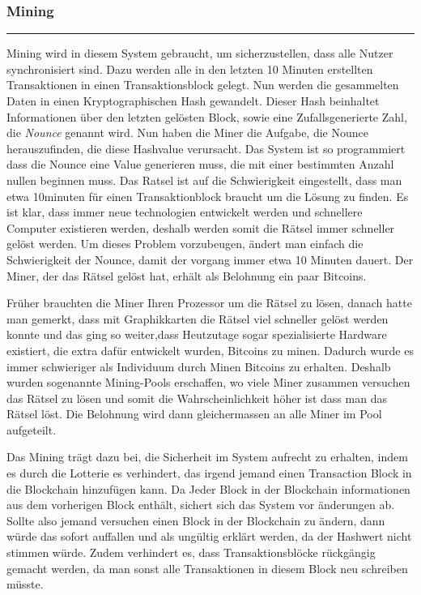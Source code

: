 \vspace*{1mm}
\subsubsection*{Mining}
\vspace{-10mm}
\noindent\rule{0.8\textwidth}{0.4pt}

\vspace{5mm}

\noindent
Mining wird in diesem System gebraucht, um sicherzustellen, dass alle Nutzer synchronisiert sind. Dazu werden alle in den letzten 10 Minuten erstellten Transaktionen in einen Transaktionsblock gelegt.
Nun werden die gesammelten Daten in einen Kryptographischen Hash gewandelt. Dieser Hash beinhaltet Informationen über den letzten gelösten Block, sowie eine Zufallsgenerierte Zahl, die
\emph{\dq Nounce \dq} genannt wird. Nun haben die Miner die Aufgabe, die Nounce herauszufinden, die diese Hashvalue verursacht. Das System ist so programmiert dass die Nounce eine Value
generieren muss, die mit einer bestimmten Anzahl nullen beginnen muss. Das Ratsel ist auf die Schwierigkeit eingestellt, dass man etwa 10minuten für einen Transaktionblock braucht um die Lösung
zu finden. Es ist klar, dass immer neue technologien entwickelt werden und schnellere Computer existieren werden, deshalb werden somit die Rätsel immer schneller gelöst werden. Um dieses Problem vorzubeugen,
ändert man einfach die Schwierigkeit der Nounce, damit der vorgang immer etwa 10 Minuten dauert. Der Miner, der das Rätsel gelöst hat, erhält als Belohnung ein paar Bitcoins.

\noindent
Früher brauchten die Miner Ihren Prozessor um die Rätsel zu lösen, danach hatte man gemerkt, dass mit Graphikkarten die Rätsel viel schneller gelöst werden konnte und das ging so weiter,dass
Heutzutage sogar spezialisierte Hardware existiert, die extra dafür entwickelt wurden, Bitcoins zu minen. Dadurch wurde es immer schwieriger als Individuum durch Minen Bitcoins zu erhalten.
Deshalb wurden sogenannte Mining-Pools erschaffen, wo viele Miner zusammen versuchen das Rätsel zu lösen und somit die Wahrscheinlichkeit höher ist dass man das Rätsel löst. Die Belohnung wird dann
gleichermassen an alle Miner im Pool aufgeteilt.

\noindent
Das Mining trägt dazu bei, die Sicherheit im System aufrecht zu erhalten, indem es durch die Lotterie es verhindert, das irgend jemand einen Transaction Block in die Blockchain hinzufügen kann.
Da Jeder Block in der Blockchain informationen aus dem vorherigen Block enthält, sichert sich das System vor änderungen ab. Sollte also jemand versuchen einen Block in der Blockchain
zu ändern, dann würde das sofort auffallen und als ungültig erklärt werden, da der Hashwert nicht stimmen würde. Zudem verhindert es, dass Transaktionsblöcke rückgängig gemacht werden, da man
sonst alle Transaktionen in diesem Block neu schreiben müsste.


\newpage
